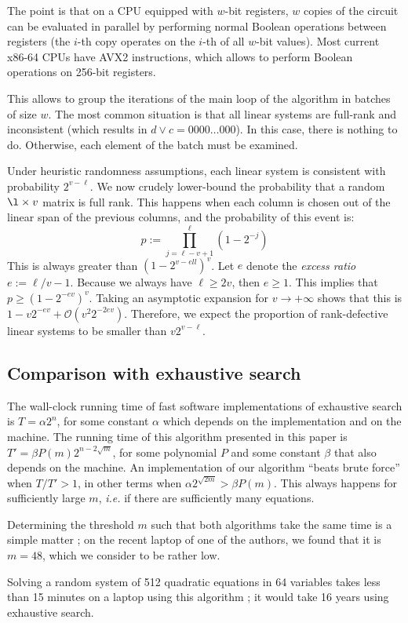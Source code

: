 \documentclass[a4paper,UKenglish,cleveref, autoref]{lipics-v2019}
\newcommand{\bigO}[1]{\ensuremath{\mathcal{O}\left( #1 \right)} }
\begin{document}
The point is that on a CPU equipped with $w$-bit registers, $w$ copies of the
circuit can be evaluated in parallel by performing normal Boolean operations
between registers (the $i$-th copy operates on the $i$-th of all $w$-bit
values). Most current \textsf{x86-64} CPUs have \textsf{AVX2} instructions,
which allows to perform Boolean operations on 256-bit registers.

This allows to group the iterations of the main loop of the algorithm in batches
of size $w$. The most common situation is that all linear systems are full-rank
and inconsistent (which results in $d \vee c = 0000 \dots 000$). In this case,
there is nothing to do. Otherwise, each element of the batch must be examined.

Under heuristic randomness assumptions, each linear system is consistent with
probability $2^{v-\ell}$. We now crudely lower-bound the probability that a
random $\l \times v$ matrix is full rank. This happens when each column is
chosen out of the linear span of the previous columns, and the probability of
this event is:
\[
  p := \prod_{j=\ell-v+1}^\ell \left(1 - 2^{-j} \right)
\]
This is always greater than $\left(1 - 2^{v-ell} \right)^v$. Let $e$ denote the
\emph{excess ratio} $e := \ell/v - 1$. Because we always have $\ell \geq 2v$,
then $e \geq 1$. This implies that $p \geq \left(1 - 2^{-ev} \right)^v$. Taking
an asymptotic expansion for $v \rightarrow +\infty$ shows that this is
$1 - v 2^{-ev} + \bigO{v^2 2^{-2ev}}$. Therefore, we expect the proportion of
rank-defective linear systems to be smaller than $v 2^{v-\ell}$.


\subsection{Comparison with exhaustive search}

The wall-clock running time of fast software implementations of exhaustive
search is $T = \alpha 2^n$, for some constant $\alpha$ which depends on the
implementation and on the machine. The running time of this algorithm presented
in this paper is $T' = \beta P(m) 2^{n - 2\sqrt{m}}$, for some polynomial $P$
and some constant $\beta$ that also depends on the machine. An implementation of
our algorithm ``beats brute force'' when $T/T' > 1$, in other terms when
$\alpha 2^{\sqrt{2m}} > \beta P(m)$. This always happens for sufficiently large
$m$, \textit{i.e.} if there are sufficiently many equations.

Determining the threshold $m$ such that both algorithms take the same time is a
simple matter ; on the recent laptop of one of the authors, we found that it is
$m=48$, which we consider to be rather low.

Solving a random system of 512 quadratic equations in 64 variables takes less
than 15 minutes on a laptop using this algorithm ; it would take 16 years using exhaustive search.


\end{document}
